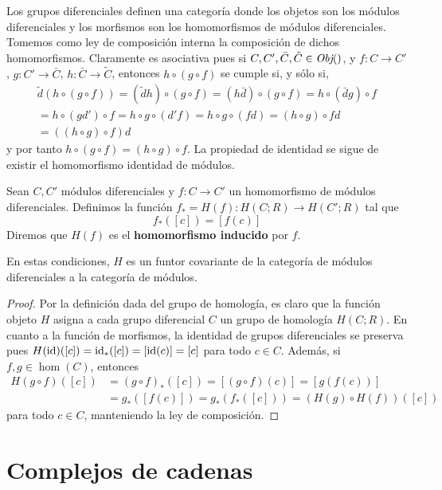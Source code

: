 Los grupos diferenciales definen una categoría donde los objetos son los módulos
diferenciales y los morfismos son los homomorfismos de módulos diferenciales. Tomemos
como ley de composición interna la composición de dichos homomorfismos.
Claramente es asociativa pues si \(C, C', \bar{C}, \tilde{C}\in \operatorname{\textit{Obj}}()\), y \(f\colon
C \to C'\), \(g \colon C' \to \bar{C}\), \(h\colon \bar{C}\to \tilde{C}\), entonces
\(h \circ (g \circ f)\) se cumple si, y sólo si,
\begin{gather*}
	\tilde{d}(h \circ (g \circ f)) = (\tilde{d}h) \circ (g \circ f) = (h\bar{d}) \circ
	(g \circ f) = h \circ (\bar{d}g) \circ f \\ = h \circ (g d') \circ f = h \circ
	g \circ (d'f) = h \circ g \circ (fd) = (h \circ g) \circ fd \\ = ((h \circ g) \circ
	f) d
\end{gather*}
y por tanto \(h \circ (g \circ f) = (h \circ g) \circ f\). La propiedad de identidad
se sigue de existir el homomorfismo identidad de módulos.

\begin{definicion}
	Sean \(C, C'\) módulos diferenciales y \(f:C \rightarrow C'\) un homomorfismo de módulos
	diferenciales. Definimos la función \(f_{*}= H(f): H(C;R) \rightarrow H(C';R)\)
	tal que
	\[
	f_{*}([c]) = [f(c)]
	\]
	Diremos que \(H(f)\) es el \textbf{homomorfismo inducido} por \(f\).
\end{definicion}
\begin{proposicion}
	En estas condiciones, \(H\) es un funtor covariante de la categoría de módulos
	diferenciales a la categoría de módulos.
\end{proposicion}
\begin{proof}
	Por la definición dada del grupo de homología, es claro que la función objeto
	\(H\) asigna a cada grupo diferencial \(C\) un grupo de homología \(H(C;R)\). En cuanto
	a la función de morfismos, la identidad de grupos diferenciales se preserva
	pues \(H(\operatorname{id})([c]) = \operatorname{id}_{*}([c]) = [\operatorname{id}(c)] = [c]\) para todo \(c \in C\). Además,
	si \(f,g \in \hom(C)\), entonces
	\begin{align*}
		H(g \circ f)([c]) & = (g \circ f)_{*}([c]) = [(g \circ f)(c)] = [g (f (c))]         \\
		& = g_{*}([f(c)]) = g_{*} ( f_{*}([c])) = (H(g) \circ H(f)) ([c])
	\end{align*}
	para todo \(c \in C\), manteniendo la ley de composición.
\end{proof}

\section{Complejos de cadenas}

